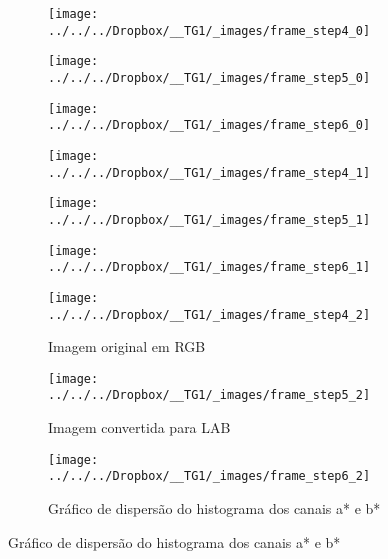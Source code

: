 \documentclass[ecp,tc]{iiufrgs}
\begin{document}
\begin{figure}[h]
	\centering
	\caption{Sequência para cálculo de histograma: Carros}
	\begin{subfigure}[b]{0.3\textwidth}
		\texttt{[image: ../../../Dropbox/\_\_TG1/\_images/frame\_step4\_0]}
		\label{}
	\end{subfigure}
	\quad
	\begin{subfigure}[b]{0.3\textwidth}
		\texttt{[image: ../../../Dropbox/\_\_TG1/\_images/frame\_step5\_0]}
		\label{}
	\end{subfigure}
	\quad
	\begin{subfigure}[b]{0.3\textwidth}
		\texttt{[image: ../../../Dropbox/\_\_TG1/\_images/frame\_step6\_0]}
		\label{}
	\end{subfigure}
	\hfill
	\begin{subfigure}[b]{0.3\textwidth}
		\texttt{[image: ../../../Dropbox/\_\_TG1/\_images/frame\_step4\_1]}
		\label{}
	\end{subfigure}
	\quad
	\begin{subfigure}[b]{0.3\textwidth}
		\texttt{[image: ../../../Dropbox/\_\_TG1/\_images/frame\_step5\_1]}
		\label{}
	\end{subfigure}
	\quad
	\begin{subfigure}[b]{0.3\textwidth}
		\texttt{[image: ../../../Dropbox/\_\_TG1/\_images/frame\_step6\_1]}
		\label{}
	\end{subfigure}
	\hfill
	\begin{subfigure}[b]{0.3\textwidth}
		\texttt{[image: ../../../Dropbox/\_\_TG1/\_images/frame\_step4\_2]}
		\label{}
		\caption{Imagem original em RGB \linebreak}
	\end{subfigure}
	\quad
	\begin{subfigure}[b]{0.3\textwidth}
		\texttt{[image: ../../../Dropbox/\_\_TG1/\_images/frame\_step5\_2]}
		\label{}
		\caption{Imagem convertida para LAB}
	\end{subfigure}
	\quad
	\begin{subfigure}[b]{0.3\textwidth}
		\texttt{[image: ../../../Dropbox/\_\_TG1/\_images/frame\_step6\_2]}
		\label{}
		\caption{Gráfico de dispersão do histograma dos canais a* e b*}
	\end{subfigure}
	\label{fig:histcar}
\end{figure}
\end{document}
